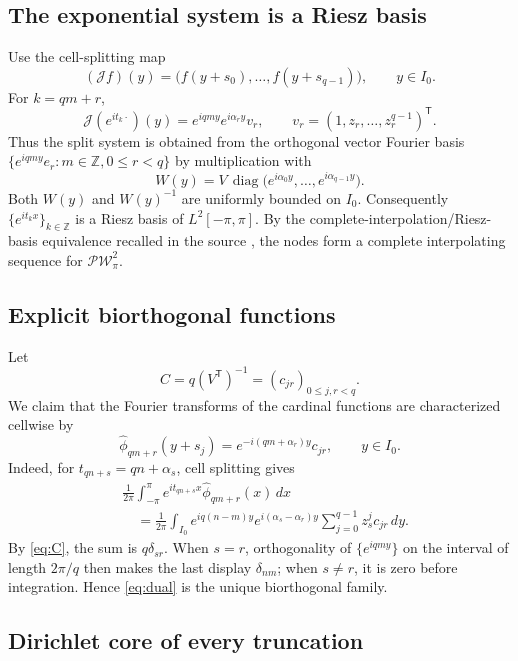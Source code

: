 \documentclass[11pt]{article}
\newcommand{\PW}{\mathcal{PW}}
\begin{document}
\subsection*{The exponential system is a Riesz basis}

Use the cell-splitting map
\[
 (\mathcal Jf)(y)=\bigl(f(y+s_0),\ldots,f(y+s_{q-1})\bigr),
 \qquad y\in I_0.
\]
For \(k=qm+r\),
\[
 \mathcal J(e^{it_k\cdot})(y)
 =e^{iqmy}e^{i\alpha_r y}v_r,
 \qquad v_r=(1,z_r,\ldots,z_r^{q-1})^{\mathsf T}.
\]
Thus the split system is obtained from the orthogonal vector Fourier basis
\(\{e^{iqmy}e_r:m\in\mathbb Z,0\leq r<q\}\) by multiplication with
\[
 W(y)=V\,\operatorname{diag}
 \bigl(e^{i\alpha_0y},\ldots,e^{i\alpha_{q-1}y}\bigr).
\]
Both \(W(y)\) and \(W(y)^{-1}\) are uniformly bounded on \(I_0\).
Consequently \(\{e^{it_kx}\}_{k\in\mathbb Z}\) is a Riesz basis of
\(L^2[-\pi,\pi]\).  By the complete-interpolation/Riesz-basis equivalence
recalled in the source \cite[Theorem 11]{source}, the nodes form a complete
interpolating sequence for \(\PW_\pi^2\).

\subsection*{Explicit biorthogonal functions}

Let
\begin{equation}\label{eq:C}
 C=q(V^{\mathsf T})^{-1}=(c_{jr})_{0\leq j,r<q}.
\end{equation}
We claim that the Fourier transforms of the cardinal functions are
characterized cellwise by
\begin{equation}\label{eq:dual}
 \widehat\phi_{qm+r}(y+s_j)
 =e^{-i(qm+\alpha_r)y}c_{jr},
 \qquad y\in I_0.
\end{equation}
Indeed, for \(t_{qn+s}=qn+\alpha_s\), cell splitting gives
\begin{align*}
 &\frac1{2\pi}\int_{-\pi}^{\pi}
 e^{it_{qn+s}x}\widehat\phi_{qm+r}(x)\,dx\\
 &\quad=\frac1{2\pi}\int_{I_0}
 e^{iq(n-m)y}e^{i(\alpha_s-\alpha_r)y}
 \sum_{j=0}^{q-1}z_s^jc_{jr}\,dy.
\end{align*}
By \eqref{eq:C}, the sum is \(q\delta_{sr}\).  When \(s=r\),
orthogonality of \(\{e^{iqmy}\}\) on the interval of length \(2\pi/q\)
then makes the last display \(\delta_{nm}\); when \(s\neq r\), it is zero
before integration.  Hence \eqref{eq:dual} is the unique biorthogonal
family.

\subsection*{Dirichlet core of every truncation}
\end{document}
